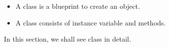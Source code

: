 \setlength{\columnsep}{3pt}
\begin{flushleft}
	
	\begin{itemize}
		\item A class is a blueprint to create an object.
		\item A class consists of instance variable and methods.
	\end{itemize}	
	In this section, we shall see class in detail.
	
\end{flushleft}

\newpage

